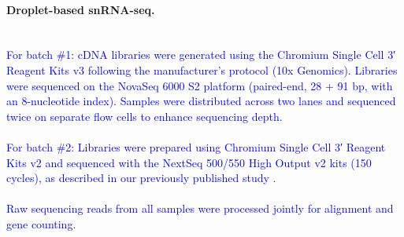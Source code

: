 \paragraph{Droplet-based snRNA-seq.}\\ 
\newcommand{\quoteJ}{\textcolor{blue}{For batch \#1: cDNA libraries were generated using the Chromium Single Cell 3′ Reagent Kits v3 following the manufacturer's protocol (10x Genomics). Libraries were sequenced on the NovaSeq 6000 S2 platform (paired-end, 28 + 91 bp, with an 8-nucleotide index). Samples were distributed across two lanes and sequenced twice on separate flow cells to enhance sequencing depth.\label{quoteJ-label}}}
\quoteJ\\\\
\newcommand{\quoteK}{\textcolor{blue}{For batch \#2: Libraries were prepared using Chromium Single Cell 3′ Reagent Kits v2 and sequenced with the NextSeq 500/550 High Output v2 kits (150 cycles), as described in our previously published study \cite{Mathys2019-wb}.}}
\quoteK\\\\
\newcommand{\quoteZ}{\textcolor{blue}{Raw sequencing reads from all samples were processed jointly for alignment and gene counting.}}
\quoteZ\\


